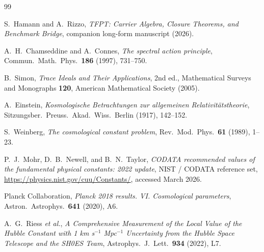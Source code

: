 \begin{thebibliography}{99}

S.~Hamann and A.~Rizzo,
\emph{TFPT: Carrier Algebra, Closure Theorems, and Benchmark Bridge},
companion long-form manuscript (2026).

A.~H.~Chamseddine and A.~Connes,
\emph{The spectral action principle},
Commun.\ Math.\ Phys.\ \textbf{186} (1997), 731--750.

B.~Simon,
\emph{Trace Ideals and Their Applications},
2nd ed., Mathematical Surveys and Monographs \textbf{120}, American Mathematical Society (2005).

A.~Einstein,
\emph{Kosmologische Betrachtungen zur allgemeinen Relativit\"atstheorie},
Sitzungsber.\ Preuss.\ Akad.\ Wiss.\ Berlin (1917), 142--152.

S.~Weinberg,
\emph{The cosmological constant problem},
Rev.\ Mod.\ Phys.\ \textbf{61} (1989), 1--23.

P.~J.~Mohr, D.~B.~Newell, and B.~N.~Taylor,
\emph{CODATA recommended values of the fundamental physical constants: 2022 update},
NIST / CODATA reference set, \url{https://physics.nist.gov/cuu/Constants/}, accessed March 2026.

Planck Collaboration,
\emph{Planck 2018 results. VI. Cosmological parameters},
Astron.\ Astrophys.\ \textbf{641} (2020), A6.

A.~G.~Riess \textit{et al.},
\emph{A Comprehensive Measurement of the Local Value of the Hubble Constant with 1 km s$^{-1}$ Mpc$^{-1}$ Uncertainty from the Hubble Space Telescope and the SH0ES Team},
Astrophys.\ J.\ Lett.\ \textbf{934} (2022), L7.

\end{thebibliography}


